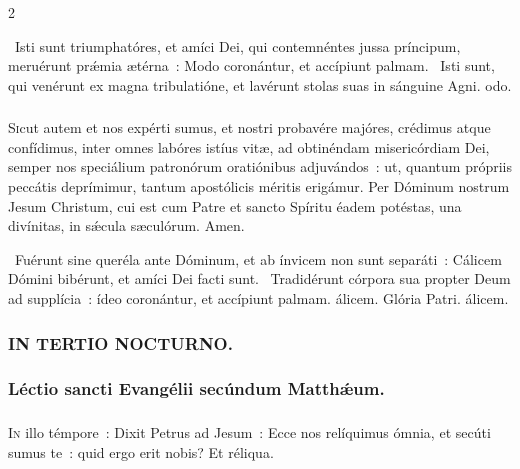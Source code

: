 \documentclass[9pt,twoside]{extarticle}
\begin{document}
\begin{multicols}{2}
{\begin{tightlist}{}
\item {}~Isti sunt triumphatóres, et amíci Dei, qui contemnéntes jussa príncipum, meruérunt prǽmia ætérna~: \textred{*} Modo coronántur, et accípiunt palmam. ~Isti sunt, qui venérunt ex magna tribulatióne, et lavérunt stolas suas in sánguine Agni. odo.
\end{tightlist}

\subsubsection*{\center {}}
\lettrine{S}icut autem et nos expérti sumus, et nostri probavére majóres, crédimus atque confídimus, inter omnes labóres istíus vitæ, ad obtinéndam misericórdiam Dei, semper nos speciálium patronórum oratiónibus adjuvándos~: ut, quantum própriis peccátis deprímimur, tantum apostólicis méritis erigámur. Per Dóminum nostrum Jesum Christum, cui est cum Patre et sancto Spíritu éadem potéstas, una divínitas, in sǽcula sæculórum. Amen.

\begin{tightlist}{}
\item {}~Fuérunt sine queréla ante Dóminum, et ab ínvicem non sunt separáti~: \textred{*} Cálicem Dómini bibérunt, et amíci Dei facti sunt.
~Tradidérunt córpora sua propter Deum ad supplícia~: ídeo coronántur, et accípiunt palmam. álicem. Glória Patri. álicem.
\end{tightlist}

\subsubsection*{\center \textsc{IN TERTIO NOCTURNO.}}
\subsubsection*{\center Léctio sancti Evangélii secúndum Matthǽum.}
\subsubsection*{\center {}}
\lettrine{I}n illo témpore~: Dixit Petrus ad Jesum~: Ecce nos relíquimus ómnia, et secúti sumus te~: quid ergo erit nobis? Et réliqua.

}
\end{multicols}
\end{document}
